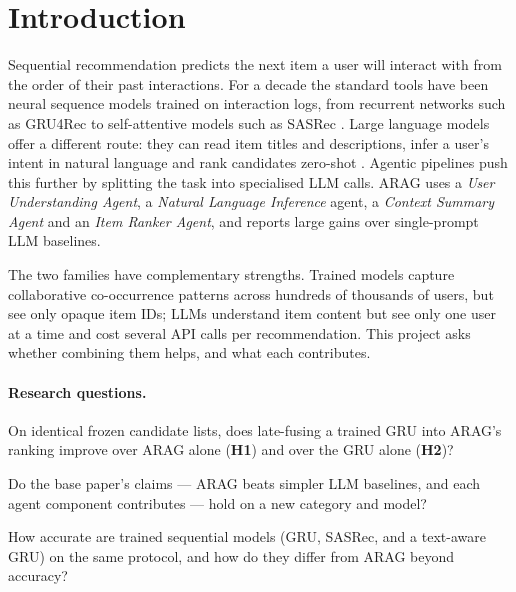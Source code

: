\documentclass[11pt,a4paper]{article}
\begin{document}
\section{Introduction}
\label{sec:intro}

Sequential recommendation predicts the next item a user will interact with from the order of
their past interactions. For a decade the standard tools have been neural sequence models trained
on interaction logs, from recurrent networks such as GRU4Rec \citep{hidasi2016session} to
self-attentive models such as SASRec \citep{kang2018self}. Large language models offer a
different route: they can read item titles and descriptions, infer a user's intent in natural
language and rank candidates zero-shot \citep{hou2024llmrank}. Agentic pipelines push this
further by splitting the task into specialised LLM calls. ARAG \citep{maragheh2025arag} uses
a \emph{User Understanding Agent}, a \emph{Natural Language Inference} agent, a \emph{Context
Summary Agent} and an \emph{Item Ranker Agent}, and reports large gains over single-prompt LLM
baselines.

The two families have complementary strengths. Trained models capture collaborative
co-occurrence patterns across hundreds of thousands of users, but see only opaque item IDs; LLMs
understand item content but see only one user at a time and cost several API calls per
recommendation. This project asks whether combining them helps, and what each contributes.

\paragraph{Research questions.}
\begin{description}[leftmargin=1.2cm,style=nextline]
  \item[RQ1] On identical frozen candidate lists, does late-fusing a trained GRU into ARAG's
  ranking improve over ARAG alone (\textbf{H1}) and over the GRU alone (\textbf{H2})?
  \item[RQ2] Do the base paper's claims --- ARAG beats simpler LLM baselines, and each agent
  component contributes --- hold on a new category and model?
  \item[RQ3] How accurate are trained sequential models (GRU, SASRec, and a text-aware GRU) on the
  same protocol, and how do they differ from ARAG beyond accuracy?
\end{description}
\end{document}
